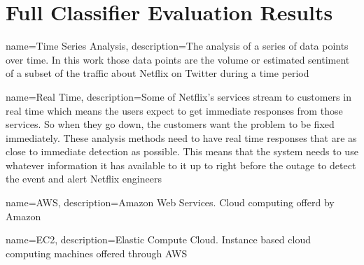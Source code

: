 \documentclass[12pt]{ucthesis}
\begin{document}
\chapter{Full Classifier Evaluation Results}
\label{appendix-full-classifier}








      {name={Time Series Analysis},
       description={The analysis of a series of data points over time. In this work those data
                    points are the volume or estimated sentiment of a subset of the traffic about
                    Netflix on Twitter during a time period}}

      {name={Real Time},
       description={Some of Netflix's services stream to customers in real time which means the
                    users expect to get immediate responses from those services. So when
                    they go down, the customers want the problem to be fixed immediately. These
                    analysis methods need to have real time responses that are as close to
                    immediate detection as possible. This means that the system needs to use
                    whatever information it has available to it up to right before the outage to
                    detect the event and alert Netflix engineers}}

      {name={AWS},
       description={Amazon Web Services. Cloud computing offerd by Amazon}}

      {name={EC2},
       description={Elastic Compute Cloud. Instance based cloud computing machines offered through AWS}}

\glsaddall
{}
\printglossaries

\clearpage


\end{document}
